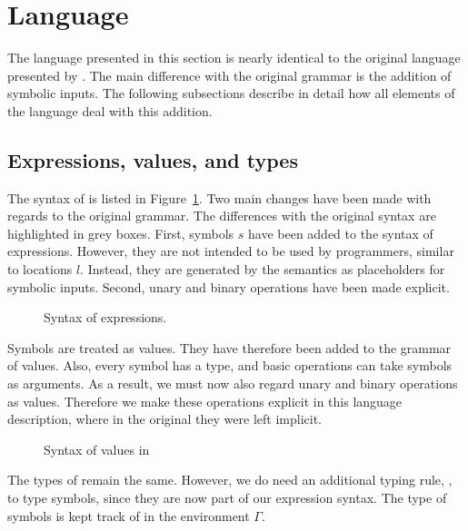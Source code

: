 
\section{Language}
\label{sec:language}

The language presented in this section is nearly identical to the original \TOPHAT language presented by \citet{Steenvoorden2019}.
The main difference with the original grammar is the addition of symbolic inputs.
The following subsections describe in detail how all elements of the \TOPHAT language deal with this addition.



\subsection{Expressions, values, and types}
\label{expressions}

The syntax of \TOPHAT is listed in Figure~\ref{fig:syntaxtophat}.
Two main changes have been made with regards to the original \TOPHAT grammar.
The differences with the original syntax are highlighted in grey boxes.
First, symbols $s$ have been added to the syntax of expressions.
However, they are not intended to be used by programmers, similar to locations $l$.
Instead, they are generated by the semantics as placeholders for symbolic inputs.
Second, unary and binary operations have been made explicit.

\begin{figure}[h]
  \small
  \caption{Syntax of \TOPHAT expressions.}
  \label{fig:syntaxtophat}
\end{figure}

Symbols are treated as values.
They have therefore been added to the grammar of values.
Also, every symbol has a type, and basic operations can take symbols as arguments.
As a result, we must now also regard unary and binary operations as values.
Therefore we make these operations explicit in this language description,
where in the original they were left implicit.

\begin{figure}[h]
  \small
  \caption{Syntax of values in \TOPHAT}
  \label{fig:syntaxvalues}
\end{figure}

The types of \TOPHAT remain the same.
However, we do need an additional typing rule, , to type symbols,
since they are now part of our expression syntax.
The type of symbols is kept track of in the environment $\Gamma$.

